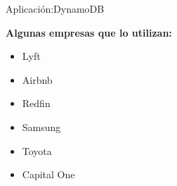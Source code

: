 \begin{frame}[fragile]{Aplicación:}{DynamoDB}
    \justifying

    {\bf Algunas empresas que lo utilizan:}\\[0.3cm]

\begin{itemize}
\item Lyft
\item Airbnb
\item Redfin
\item Samsung
\item Toyota
\item Capital One
\end{itemize}

\end{frame}
